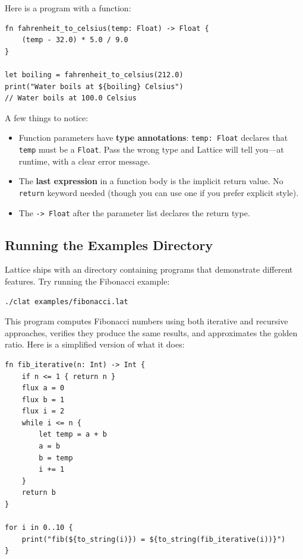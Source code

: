 Here is a program with a function:

\begin{lstlisting}[language=Lattice, caption={A function with a type annotation}]
fn fahrenheit_to_celsius(temp: Float) -> Float {
    (temp - 32.0) * 5.0 / 9.0
}

let boiling = fahrenheit_to_celsius(212.0)
print("Water boils at ${boiling} Celsius")
// Water boils at 100.0 Celsius
\end{lstlisting}

A few things to notice:

\begin{itemize}
  \item Function parameters have \textbf{type annotations}: \lstinline|temp: Float| declares that \lstinline|temp| must be a \lstinline|Float|. Pass the wrong type and Lattice will tell you---at runtime, with a clear error message.
  \item The \textbf{last expression} in a function body is the implicit return value. No \lstinline|return| keyword needed (though you can use one if you prefer explicit style).
  \item The \lstinline|-> Float| after the parameter list declares the return type.
\end{itemize}

\subsection{Running the Examples Directory}\label{subsec:running-examples}

Lattice ships with an  directory containing programs that demonstrate different features.
Try running the Fibonacci example:

\begin{lstlisting}[language=bash, numbers=none]
./clat examples/fibonacci.lat
\end{lstlisting}

This program computes Fibonacci numbers using both iterative and recursive approaches, verifies they produce the same results, and approximates the golden ratio.
Here is a simplified version of what it does:

\begin{lstlisting}[language=Lattice, caption={A taste of the Fibonacci example}]
fn fib_iterative(n: Int) -> Int {
    if n <= 1 { return n }
    flux a = 0
    flux b = 1
    flux i = 2
    while i <= n {
        let temp = a + b
        a = b
        b = temp
        i += 1
    }
    return b
}

for i in 0..10 {
    print("fib(${to_string(i)}) = ${to_string(fib_iterative(i))}")
}
\end{lstlisting}

